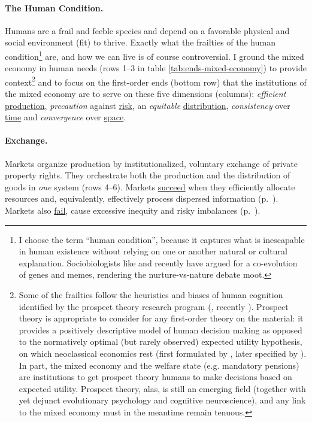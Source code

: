 
	

\paragraph{The Human Condition.} \label{sec:human-condition}  Humans are a frail and feeble species and depend on a favorable physical and social environment (fit) to thrive. Exactly what the frailties of the human condition\footnote{
	\label{fn:humancondition}I choose the term ``human condition'', because it captures what is inescapable in human existence without relying on one or another natural or cultural explanation. Sociobiologists like \cite{Boyd1985} and recently \cite{Henrich2007} have argued for a co-evolution of genes and memes, rendering the nurture-vs-nature debate moot.}
are, and how we can live is of course controversial. I ground the mixed economy in human needs (rows 1--3 in table \ref{tab:ends-mixed-economy}) to provide context\footnote{
	Some of the frailties follow the heuristics and biases of human cognition identified by the prospect theory research program (\citealt{Kahneman1979}, recently \citealt{Kahneman2011}). Prospect theory is appropriate to consider for any first-order theory on the material: it provides a positively descriptive model of human decision making as opposed to the normatively optimal (but rarely observed) expected utility hypothesis, on which neoclassical economics rest (first formulated by \citealt{Bernoulli1738}, later specified by \citealt{VonNeumann1944}). In part, the mixed economy and the welfare state (e.g. mandatory pensions) are institutions to get prospect theory humans to make decisions based on expected utility. Prospect theory, alas, is still an emerging field (together with yet dejunct evolutionary psychology and cognitive neuroscience), and any link to the mixed economy must in the meantime remain tenuous.} 
and to focus on the first-order ends (bottom row) that the institutions of the mixed economy are to serve on these five dimensions (columns): \emph{efficient} \hyperref[sec:production]{production}, \emph{precaution} against \hyperref[sec:risk]{risk}, an \emph{equitable} \hyperref[sec:distribution]{distribution}, \emph{consistency} over \hyperref[sec:time]{time} and \emph{convergence} over \hyperref[sec:space]{space}.

\paragraph[Exchange]{Exchange.}  \label{sec:exchange} 
Markets organize production by institutionalized, voluntary exchange of private property rights. They orchestrate both the production and the distribution of goods in \emph{one} system (rows 4--6). Markets \hyperref[sec:market-solutions-production]{succeed} when they efficiently allocate resources and, equivalently, effectively process dispersed information (p.~\pageref{sec:market-solutions-production}). Markets also \hyperref[sec:market-failures]{fail}, cause excessive inequity and risky imbalances (p.~\pageref{sec:market-failures}). 

